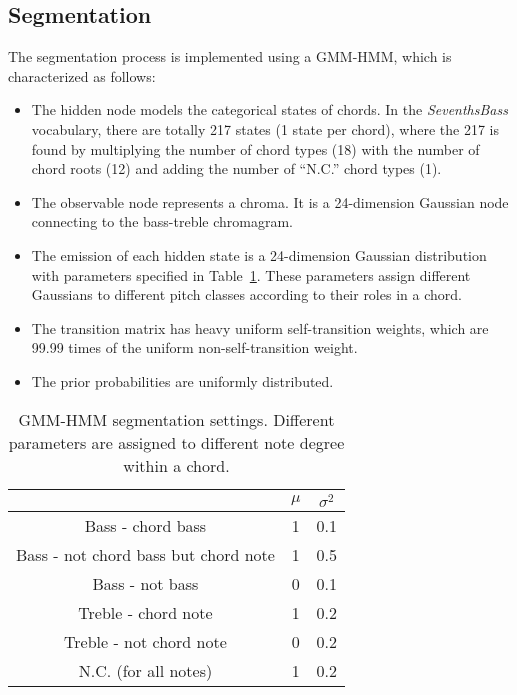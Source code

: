 \subsection{Segmentation} \label{sec:3-sg}
The segmentation process is implemented using a GMM-HMM, which is characterized as follows:
\begin{itemize}
	\item The hidden node models the categorical states of chords. In the \textit{SeventhsBass} vocabulary, there are totally 217 states (1 state per chord), where the 217 is found by multiplying the number of chord types (18) with the number of chord roots (12) and adding the number of ``N.C.'' chord types (1).
	
	\item The observable node represents a chroma. It is a 24-dimension Gaussian node connecting to the bass-treble chromagram.
	
	\item The emission of each hidden state is a 24-dimension Gaussian distribution with parameters specified in Table~\ref{tab:3-gaussian}. These parameters assign different Gaussians to different pitch classes according to their roles in a chord.
	
	\item The transition matrix has heavy uniform self-transition weights, which are 99.99 times of the uniform non-self-transition weight.
	
	\item The prior probabilities are uniformly distributed.
\end{itemize}

\begin{table}
\centering
\footnotesize
\begin{tabular}{|c|c|c|} \hline
      & $\mu$ & $\sigma^2$ \\ \hline
 Bass - chord bass & 1 & 0.1 \\ \hline
 Bass - not chord bass but chord note & 1 & 0.5  \\ \hline
 Bass - not bass & 0 & 0.1 \\ \hline
 Treble - chord note & 1 & 0.2  \\ \hline
 Treble - not chord note & 0 & 0.2 \\ \hline
 N.C. (for all notes)  & 1 & 0.2  \\ \hline
\end{tabular}
\caption{GMM-HMM segmentation settings. Different parameters are assigned to different note degree within a chord.}
\label{tab:3-gaussian}
\end{table}

